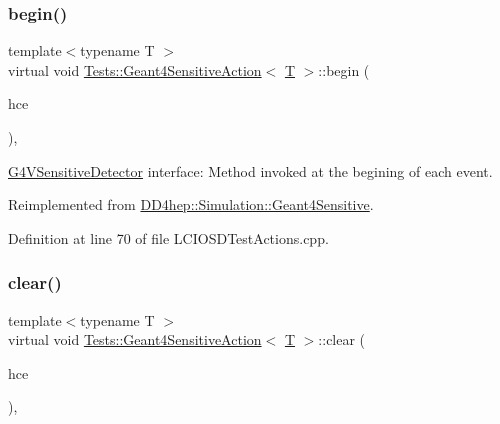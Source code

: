 \subsubsection{\texorpdfstring{begin()}{begin()}}
{\footnotesize\ttfamily template$<$typename T $>$ \\
virtual void \hyperlink{class_tests_1_1_geant4_sensitive_action}{Tests\+::\+Geant4\+Sensitive\+Action}$<$ \hyperlink{class_t}{T} $>$\+::begin (\begin{DoxyParamCaption}\item[{G4\+H\+Cof\+This\+Event $\ast$}]{hce }\end{DoxyParamCaption})\hspace{0.3cm}{\ttfamily [inline]}, {\ttfamily [virtual]}}



\hyperlink{class_g4_v_sensitive_detector}{G4\+V\+Sensitive\+Detector} interface\+: Method invoked at the begining of each event. 



Reimplemented from \hyperlink{class_d_d4hep_1_1_simulation_1_1_geant4_sensitive_a2967b095e6c32ae82f68a8b25a086c86}{D\+D4hep\+::\+Simulation\+::\+Geant4\+Sensitive}.



Definition at line 70 of file L\+C\+I\+O\+S\+D\+Test\+Actions.\+cpp.

\hypertarget{class_tests_1_1_geant4_sensitive_action_a4d02434822c244ee5c5d6aee7e15c993}{}\label{class_tests_1_1_geant4_sensitive_action_a4d02434822c244ee5c5d6aee7e15c993} 
\subsubsection{\texorpdfstring{clear()}{clear()}}
{\footnotesize\ttfamily template$<$typename T $>$ \\
virtual void \hyperlink{class_tests_1_1_geant4_sensitive_action}{Tests\+::\+Geant4\+Sensitive\+Action}$<$ \hyperlink{class_t}{T} $>$\+::clear (\begin{DoxyParamCaption}\item[{G4\+H\+Cof\+This\+Event $\ast$}]{hce }\end{DoxyParamCaption})\hspace{0.3cm}{\ttfamily [inline]}, {\ttfamily [virtual]}}



